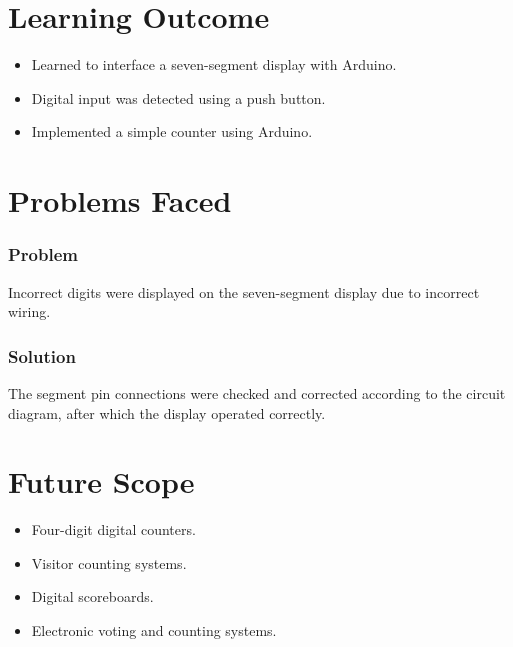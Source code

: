 \documentclass[12pt,a4paper]{report}
\begin{document}
\section{Learning Outcome}

\begin{itemize}

\item Learned to interface a seven-segment display with Arduino.

\item Digital input was detected using a push button.

\item Implemented a simple counter using Arduino.

\end{itemize}

\thispagestyle{githubpage}


\section{Problems Faced}

\subsubsection{Problem}

Incorrect digits were displayed on the seven-segment display due to incorrect wiring.

\vspace{0.1cm}

\subsubsection{Solution}

The segment pin connections were checked and corrected according to the circuit diagram, after which the display operated correctly.

\section{Future Scope}

\begin{itemize}

\item Four-digit digital counters.

\item Visitor counting systems.

\item Digital scoreboards.

\item Electronic voting and counting systems.

\end{itemize}
\end{document}
